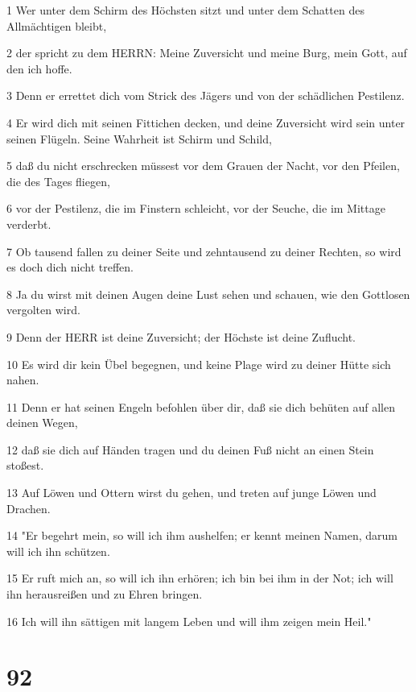 \par 1 Wer unter dem Schirm des Höchsten sitzt und unter dem Schatten des Allmächtigen bleibt,
\par 2 der spricht zu dem HERRN: Meine Zuversicht und meine Burg, mein Gott, auf den ich hoffe.
\par 3 Denn er errettet dich vom Strick des Jägers und von der schädlichen Pestilenz.
\par 4 Er wird dich mit seinen Fittichen decken, und deine Zuversicht wird sein unter seinen Flügeln. Seine Wahrheit ist Schirm und Schild,
\par 5 daß du nicht erschrecken müssest vor dem Grauen der Nacht, vor den Pfeilen, die des Tages fliegen,
\par 6 vor der Pestilenz, die im Finstern schleicht, vor der Seuche, die im Mittage verderbt.
\par 7 Ob tausend fallen zu deiner Seite und zehntausend zu deiner Rechten, so wird es doch dich nicht treffen.
\par 8 Ja du wirst mit deinen Augen deine Lust sehen und schauen, wie den Gottlosen vergolten wird.
\par 9 Denn der HERR ist deine Zuversicht; der Höchste ist deine Zuflucht.
\par 10 Es wird dir kein Übel begegnen, und keine Plage wird zu deiner Hütte sich nahen.
\par 11 Denn er hat seinen Engeln befohlen über dir, daß sie dich behüten auf allen deinen Wegen,
\par 12 daß sie dich auf Händen tragen und du deinen Fuß nicht an einen Stein stoßest.
\par 13 Auf Löwen und Ottern wirst du gehen, und treten auf junge Löwen und Drachen.
\par 14 "Er begehrt mein, so will ich ihm aushelfen; er kennt meinen Namen, darum will ich ihn schützen.
\par 15 Er ruft mich an, so will ich ihn erhören; ich bin bei ihm in der Not; ich will ihn herausreißen und zu Ehren bringen.
\par 16 Ich will ihn sättigen mit langem Leben und will ihm zeigen mein Heil."

\chapter{92}

